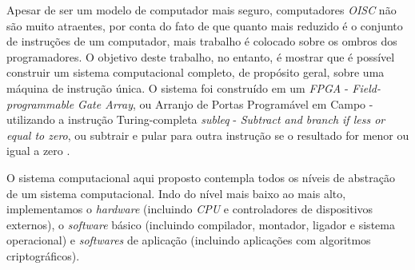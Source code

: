 Apesar de ser um modelo de computador mais seguro, computadores \textit{OISC} não são muito atraentes, por conta do fato de que quanto mais reduzido é o conjunto de instruções de um computador, mais trabalho é colocado sobre os ombros dos programadores. O objetivo deste trabalho, no entanto, é mostrar que é possível construir um sistema computacional completo, de propósito geral, sobre uma máquina de instrução única. O sistema foi construído em um \textit{FPGA} - \textit{Field-programmable Gate Array}, ou Arranjo de Portas Programável em Campo \cite{brant2012zuma} - utilizando a instrução Turing-completa \textit{subleq} - \textit{Subtract and branch if less or equal to zero}, ou subtrair e pular para outra instrução se o resultado for menor ou igual a zero \cite{subleq}.

O sistema computacional aqui proposto contempla todos os níveis de abstração de um sistema computacional. Indo do nível mais baixo ao mais alto, implementamos o \textit{hardware} (incluindo \textit{CPU} e controladores de dispositivos externos), o \textit{software} básico (incluindo compilador, montador, ligador e sistema operacional) e \textit{softwares} de aplicação (incluindo aplicações com algoritmos criptográficos).
